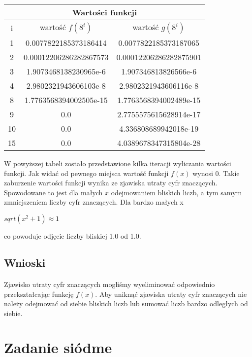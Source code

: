 \documentclass[a4paper]{article}
\begin{document}
\begin{center}
 \begin{tabular}{ ||c | c | c ||  }
 \hline
 \multicolumn{3}{|c|}{Wartości funkcji} \\
 \hline
 i & wartość $f(8^i)$ & wartość $g(8^i)$\\
 1 & 0.0077822185373186414 & 0.0077822185373187065\\
 2 & 0.00012206286282867573 & 0.00012206286282875901\\
 3 & 1.9073468138230965e-6 & 1.907346813826566e-6\\
 4 & 2.9802321943606103e-8 & 2.9802321943606116e-8\\
 8 & 1.7763568394002505e-15 & 1.7763568394002489e-15\\
 9 & 0.0 & 2.7755575615628914e-17\\
 10 & 0.0 & 4.336808689942018e-19\\
 15 & 0.0 & 4.0389678347315804e-28\\
 \hline
 
\end{tabular}
\end{center}

W powyższej tabeli zostało przedstawione kilka iteracji wyliczania wartości funkcji. Jak widać od pewnego miejsca wartość funkcji $f(x)$ wynosi 0. Takie zaburzenie wartości funkcji wynika ze zjawiska utraty cyfr znaczących. Spowodowane to jest dla małych $x$ odejmowaniem bliskich liczb, a tym samym zmniejszeniem liczby cyfr znaczących. Dla bardzo małych x
\begin{center}
$sqrt(x^2 + 1) \approx 1$
\end{center}
co powoduje odjęcie liczby bliskiej 1.0 od 1.0.
\subsection{Wnioski}
\paragraph{}
Zjawisko utraty cyfr znaczących mogliśmy wyeliminować odpowiednio przekształcając funkcję $f(x)$. Aby uniknąć zjawiska utraty cyfr znaczących nie należy odejmować od siebie bliskich liczb lub sumować liczb bardzo odległych od siebie.

\section{Zadanie siódme}
\end{document}

